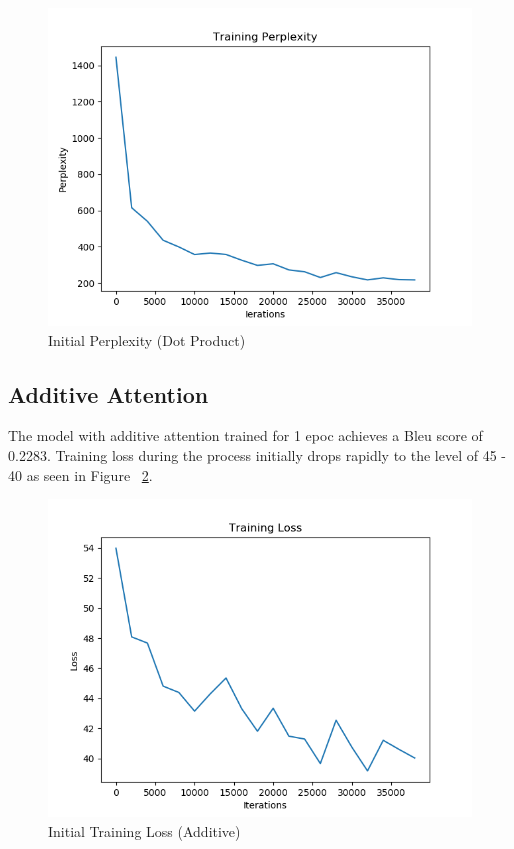 \documentclass[11pt,a4paper]{article}
\begin{document}
\begin{figure}[!htbp]
\includegraphics[width=\linewidth]{de_dot_ppl_1.png}
\caption{Initial Perplexity (Dot Product)}
\label{fig23}
\end{figure}


\pagebreak

\subsection{Additive Attention}

The model with additive attention trained for 1 epoc achieves a Bleu score of 0.2283.
Training loss during the process initially drops rapidly to the level of 45 - 40 as seen in Figure ~\ref{fig25}. 

\begin{figure}[!htbp]
\includegraphics[width=\linewidth]{de_add_loss_1.png}
\caption{Initial Training Loss (Additive)}
\label{fig25}
\end{figure}
\end{document}
